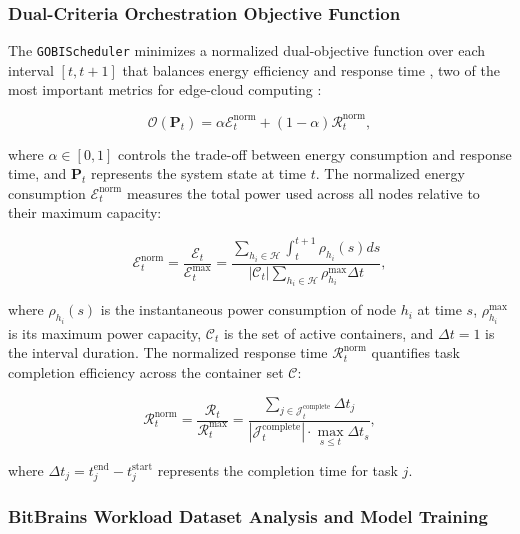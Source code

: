 \documentclass{ieeetmlcn}
\begin{document}
\subsubsection{Dual-Criteria Orchestration Objective Function}

The \texttt{GOBIScheduler} minimizes a normalized dual-objective function over each interval $[t, t+1]$ that balances energy efficiency and response time \cite{tuli2021cosco}, two of the most important metrics for edge-cloud computing \cite{mcchesney2019defog}:

\begin{equation}
\label{eq:objective_function}
\mathcal{O}(\mathbf{P}_t) = \alpha   \mathcal{E}_t^{\text{norm}} + (1-\alpha)   \mathcal{R}_t^{\text{norm}},
\end{equation}

\noindent where $\alpha \in [0,1]$ controls the trade-off between energy consumption and response time, and $\mathbf{P}_t$ represents the system state at time $t$. The normalized energy consumption $\mathcal{E}_t^{\text{norm}}$ measures the total power used across all nodes relative to their maximum capacity:

\begin{equation}
\label{eq:energy_consumption}
\mathcal{E}_t^{\text{norm}} = \frac{\mathcal{E}_t}{\mathcal{E}_t^{\text{max}}} = \frac{\sum_{h_i \in \mathcal{H}} \int_{t}^{t+1} \rho_{h_i}(s)   ds}{|\mathcal{C}_t| \sum_{h_i \in \mathcal{H}} \rho_{h_i}^{\text{max}} \Delta t},
\end{equation}

\noindent where $\rho_{h_i}(s)$ is the instantaneous power consumption of node $h_i$ at time $s$, $\rho_{h_i}^{\text{max}}$ is its maximum power capacity, $\mathcal{C}_t$ is the set of active containers, and $\Delta t = 1$ is the interval duration. The normalized response time $\mathcal{R}_t^{\text{norm}}$ quantifies task completion efficiency across the container set $\mathcal{C}$:

\begin{equation}
\label{eq:response_time}
\mathcal{R}_t^{\text{norm}} = \frac{\mathcal{R}_t}{\mathcal{R}_t^{\text{max}}} = \frac{\sum_{j \in \mathcal{J}_t^{\text{complete}}} \Delta t_j}
{|\mathcal{J}_t^{\text{complete}}| \cdot \max_{s \leq t} \Delta t_s},
\end{equation}

\noindent where $\Delta t_j = t_j^{\text{end}} - t_j^{\text{start}}$ represents the completion time for task $j$.

\subsubsection{BitBrains Workload Dataset Analysis and Model Training}
\end{document}
